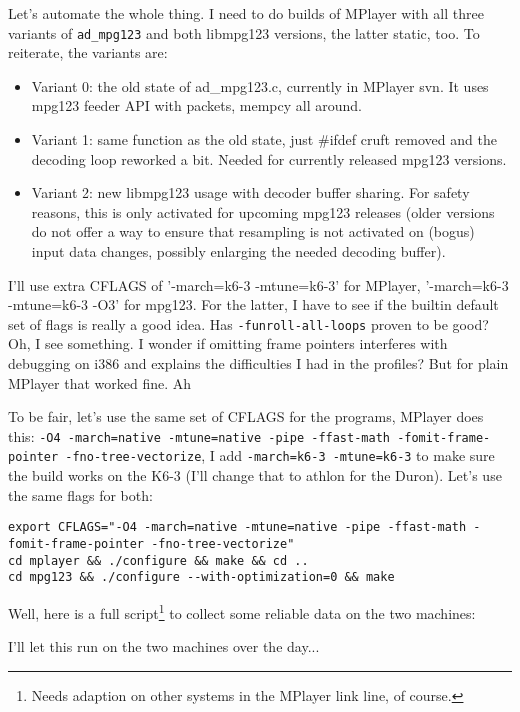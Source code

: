 \documentclass[a4paper,12pt]{scrartcl}
\begin{document}
Let's automate the whole thing. I need to do builds of MPlayer with all three variants of \verb:ad_mpg123: and both libmpg123 versions, the latter static, too.
To reiterate, the variants are:
\begin{itemize}
	\item Variant 0: the old state of ad\_mpg123.c, currently in MPlayer svn. It uses mpg123 feeder API with packets,  mempcy all around.
	\item Variant 1: same function as the old state, just \#ifdef cruft removed and the decoding loop reworked a bit. Needed for currently released mpg123 versions.
	\item Variant 2: new libmpg123 usage with decoder buffer sharing. For safety reasons, this is only activated for upcoming mpg123 releases (older versions do not offer a way to ensure that resampling is not activated on (bogus) input data changes, possibly enlarging the needed decoding buffer).
\end{itemize}

I'll use extra CFLAGS of '-march=k6-3 -mtune=k6-3' for MPlayer, '-march=k6-3 -mtune=k6-3 -O3' for mpg123. For the latter, I have to see if the builtin default set of flags is really a good idea. Has \verb:-funroll-all-loops: proven to be good? Oh, I see something. I wonder if omitting frame pointers interferes with debugging on i386 and explains the difficulties I had in the profiles? But for plain MPlayer that worked fine. Ah

To be fair, let's use the same set of CFLAGS for the programs, MPlayer does this: \verb:-O4 -march=native -mtune=native -pipe -ffast-math -fomit-frame-pointer -fno-tree-vectorize:, I add \verb:-march=k6-3 -mtune=k6-3: to make sure the build works on the K6-3 (I'll change that to athlon for the Duron). Let's use the same flags for both:

\begin{verbatim}
export CFLAGS="-O4 -march=native -mtune=native -pipe -ffast-math -fomit-frame-pointer -fno-tree-vectorize"
cd mplayer && ./configure && make && cd ..
cd mpg123 && ./configure --with-optimization=0 && make
\end{verbatim}

Well, here is a full script\footnote{Needs adaption on other systems in the MPlayer link line, of course.} to collect some reliable data on the two machines:

I'll let this run on the two machines over the day...
\end{document}
